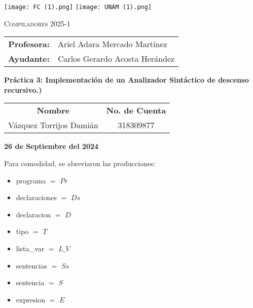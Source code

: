 \documentclass[letterpaper,12pt,titlepage]{article}
\title{}
\author{}
\date{}
\begin{document}
\begin{titlepage}
\begin{flushleft}																\texttt{[image: FC (1).png]} \hfill \texttt{[image: UNAM (1).png]}
\end{flushleft}
    \begin{center}
    {\large \textsc{Compiladores 2025-1}}
\end{center}
\begin{table}[h]
 \centering
\begin{tabular}{r l}
 \small \bfseries Profesora: & \hspace{-0.4cm} \small Ariel Adara Mercado Martínez\\
 \small \bfseries Ayudante: & \hspace{-0.4cm} \small Carlos Gerardo Acosta Herández\\
\end{tabular}
\end{table}

\begin{center}
\large{\textbf{Práctica 3: Implementación de un Analizador Sintáctico de descenso recursivo.)}}
\end{center}


\begin{center}
\begin{tabular}{c c}
   \textbf{Nombre}  & \textbf{No. de Cuenta} \\
    Vázquez Torrijos Damián & 318309877\\
    
\end{tabular}
\end{center}
\vspace*{1cm}%
\begin{center}
    \textbf{\large{26 de Septiembre del 2024}}
\end{center}

\end{titlepage}

Para comodidad, se abreviaron las producciones:
\begin{itemize}
    \item programa $=$ $Pr$
    \item declaraciones $=$ $Ds$
    \item declaracion $=$ $D$
    \item tipo $=$ $T$
    \item lista\_var $=$ $L\_V$
    \item sentencias $=$ $Ss$
    \item sentencia $=$ $S$
    \item expresion $=$ $E$
\end{itemize}
\end{document}
